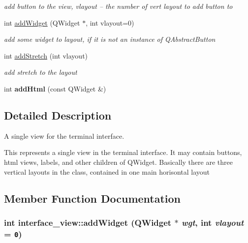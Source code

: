 \begin{CompactItemize}
\begin{CompactList}\small\item\em add button to the view, vlayout -- the number of vert layout to add button to \item\end{CompactList}\item 
int \hyperlink{classinterface__view_236caa7c5f081fdbbbf44ab968da47fb}{addWidget} (QWidget $\ast$, int vlayout=0)
\begin{CompactList}\small\item\em add some widget to layout, if it is not an instance of QAbstractButton \item\end{CompactList}\item 
\hypertarget{classinterface__view_a4cd169f585553ac5247533836767ac3}{
int \hyperlink{classinterface__view_a4cd169f585553ac5247533836767ac3}{addStretch} (int vlayout)}
\label{classinterface__view_a4cd169f585553ac5247533836767ac3}

\begin{CompactList}\small\item\em add stretch to the layout \item\end{CompactList}\item 
\hypertarget{classinterface__view_019075445aa648d995d24806b2f6126e}{
int \textbf{addHtml} (const QWidget \&)}
\label{classinterface__view_019075445aa648d995d24806b2f6126e}

\end{CompactItemize}


\subsection{Detailed Description}
A single view for the terminal interface. 

This represents a single view in the terminal interface. It may contain buttons, html views, labels, and other children of QWidget. Basically there are three vertical layouts in the class, contained in one main horisontal layout 

\subsection{Member Function Documentation}
\hypertarget{classinterface__view_236caa7c5f081fdbbbf44ab968da47fb}{
\subsubsection[{addWidget}]{\setlength{\rightskip}{0pt plus 5cm}int interface\_\-view::addWidget (QWidget $\ast$ {\em wgt}, \/  int {\em vlayout} = {\tt 0})}}
\label{classinterface__view_236caa7c5f081fdbbbf44ab968da47fb}


